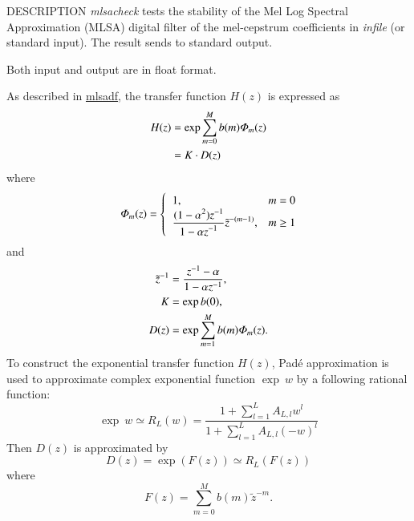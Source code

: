 \begin{synopsis}
\item [mlsacheck] [ --m $M$ ] [ --a $A$ ] [ --c $C$ ] [ --r ] [ --l $L$]
[ --R ] [--P $Pa$ ] [ {\em infile} ]
\end{synopsis}

\begin{qsection}{DESCRIPTION}
 {\em mlsacheck} tests the stability of
 the Mel Log Spectral Approximation (MLSA) digital filter
 of the mel-cepstrum coefficients in {\em infile} (or standard input).
 The result sends to standard output.

 Both input and output are in float format.

 As described in \hyperlink{mlsadf}{mlsadf},
 the transfer function $H(z)$ is expressed as
\begin{align}
H(z) &= \exp \sum_{m=0}^M b(m) {\it\Phi}_m(z) \notag \\
     &= K \cdot D(z)\notag
\end{align}
where
\begin{displaymath}
{\it\Phi}_m(z) = \begin{cases}
	  \;\;1, & m=0 \\ \;\;\displaystyle
	  \frac{\displaystyle (1-\alpha^2)z^{-1}}
	    {\displaystyle 1-\alpha z^{-1}}
	    \tilde{z}^{-(m-1)},& m\geq 1
	\end{cases}
\end{displaymath}
and
\begin{align}
\tilde{z}^{-1} &= \frac{z^{-1}-\alpha}{1-\alpha z^{-1}}, \notag \\
K    &= \exp b(0) \notag, \\
D(z) &= \exp \sum_{m=1}^M b(m) {\it\Phi}_m(z).  \notag
\end{align}
To construct the exponential transfer function $H(z)$,
 Pad\'e approximation is used to approximate complex exponential function
 $\exp\:w$
 by a following rational function:
  \begin{displaymath}
   \exp\:w \simeq  R_L(w) = \frac{1+\sum_{l=1}^{L}A_{L,l}w^{l}}{1+\sum_{l=1}^{L}A_{L,l}(-w)^{l}}
  \end{displaymath}
 Then $D(z)$ is approximated by
  \begin{displaymath}
   D(z) = \exp(F(z)) \simeq R_{L}(F(z))
  \end{displaymath}
 where
  \begin{displaymath}
   F(z) = \sum_{m=0}^{M}b(m)\tilde{z}^{-m}.
  \end{displaymath}


\end{qsection}
